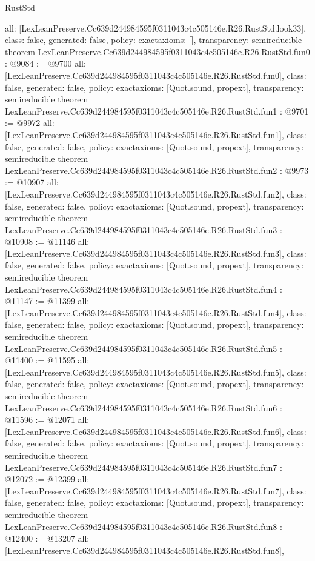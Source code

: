\begin{lexlean}{RustStd}
\begin{coremodule}
{  all: [LexLeanPreserve.Cc639d244984595f0311043c4c505146e.R26.RustStd.look33],
  class: false,
  generated: false,
  policy: exact{axioms: []},
  transparency: semireducible
}
theorem LexLeanPreserve.Cc639d244984595f0311043c4c505146e.R26.RustStd.fun0 : @9084 := @9700 {
  all: [LexLeanPreserve.Cc639d244984595f0311043c4c505146e.R26.RustStd.fun0],
  class: false,
  generated: false,
  policy: exact{axioms: [Quot.sound, propext]},
  transparency: semireducible
}
theorem LexLeanPreserve.Cc639d244984595f0311043c4c505146e.R26.RustStd.fun1 : @9701 := @9972 {
  all: [LexLeanPreserve.Cc639d244984595f0311043c4c505146e.R26.RustStd.fun1],
  class: false,
  generated: false,
  policy: exact{axioms: [Quot.sound, propext]},
  transparency: semireducible
}
theorem LexLeanPreserve.Cc639d244984595f0311043c4c505146e.R26.RustStd.fun2 : @9973 := @10907 {
  all: [LexLeanPreserve.Cc639d244984595f0311043c4c505146e.R26.RustStd.fun2],
  class: false,
  generated: false,
  policy: exact{axioms: [Quot.sound, propext]},
  transparency: semireducible
}
theorem LexLeanPreserve.Cc639d244984595f0311043c4c505146e.R26.RustStd.fun3 : @10908 := @11146 {
  all: [LexLeanPreserve.Cc639d244984595f0311043c4c505146e.R26.RustStd.fun3],
  class: false,
  generated: false,
  policy: exact{axioms: [Quot.sound, propext]},
  transparency: semireducible
}
theorem LexLeanPreserve.Cc639d244984595f0311043c4c505146e.R26.RustStd.fun4 : @11147 := @11399 {
  all: [LexLeanPreserve.Cc639d244984595f0311043c4c505146e.R26.RustStd.fun4],
  class: false,
  generated: false,
  policy: exact{axioms: [Quot.sound, propext]},
  transparency: semireducible
}
theorem LexLeanPreserve.Cc639d244984595f0311043c4c505146e.R26.RustStd.fun5 : @11400 := @11595 {
  all: [LexLeanPreserve.Cc639d244984595f0311043c4c505146e.R26.RustStd.fun5],
  class: false,
  generated: false,
  policy: exact{axioms: [Quot.sound, propext]},
  transparency: semireducible
}
theorem LexLeanPreserve.Cc639d244984595f0311043c4c505146e.R26.RustStd.fun6 : @11596 := @12071 {
  all: [LexLeanPreserve.Cc639d244984595f0311043c4c505146e.R26.RustStd.fun6],
  class: false,
  generated: false,
  policy: exact{axioms: [Quot.sound, propext]},
  transparency: semireducible
}
theorem LexLeanPreserve.Cc639d244984595f0311043c4c505146e.R26.RustStd.fun7 : @12072 := @12399 {
  all: [LexLeanPreserve.Cc639d244984595f0311043c4c505146e.R26.RustStd.fun7],
  class: false,
  generated: false,
  policy: exact{axioms: [Quot.sound, propext]},
  transparency: semireducible
}
theorem LexLeanPreserve.Cc639d244984595f0311043c4c505146e.R26.RustStd.fun8 : @12400 := @13207 {
  all: [LexLeanPreserve.Cc639d244984595f0311043c4c505146e.R26.RustStd.fun8],
}
\end{coremodule}
\end{lexlean}

